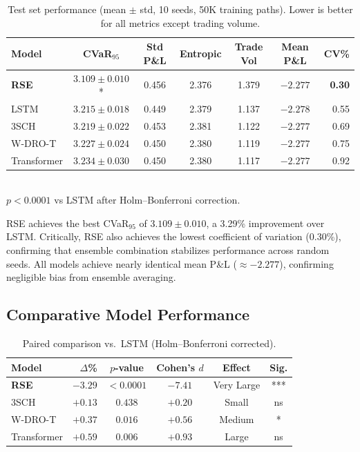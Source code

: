 \begin{table}[H]
\centering\small
\caption{Test set performance (mean $\pm$ std, 10 seeds, 50K training paths). Lower is better for all metrics except trading volume.}
\label{tab:main_results}
\begin{tabular}{@{}lcccccr@{}}
\toprule
\textbf{Model} & \textbf{CVaR$_{95}$} & \textbf{Std P\&L} & \textbf{Entropic} & \textbf{Trade Vol} & \textbf{Mean P\&L} & \textbf{CV\%} \\\midrule
\textbf{RSE} & $\mathbf{3.109 \pm 0.010}$* & 0.456 & 2.376 & 1.379 & $-2.277$ & \textbf{0.30} \\
LSTM & $3.215 \pm 0.018$ & 0.449 & 2.379 & 1.137 & $-2.278$ & 0.55 \\
3SCH & $3.219 \pm 0.022$ & 0.453 & 2.381 & 1.122 & $-2.277$ & 0.69 \\
W-DRO-T & $3.227 \pm 0.024$ & 0.450 & 2.380 & 1.119 & $-2.277$ & 0.75 \\
Transformer & $3.234 \pm 0.030$ & 0.450 & 2.380 & 1.117 & $-2.277$ & 0.92 \\
\midrule

\end{tabular}
\\[3pt]{\footnotesize * $p < 0.0001$ vs LSTM after Holm--Bonferroni correction.}
\end{table}

RSE achieves the best CVaR$_{95}$ of $3.109 \pm 0.010$, a 3.29\% improvement over LSTM. Critically, RSE also achieves the lowest coefficient of variation (0.30\%), confirming that ensemble combination stabilizes performance across random seeds. All models achieve nearly identical mean P\&L ($\approx -2.277$), confirming negligible bias from ensemble averaging.

\subsection{Comparative Model Performance}

\begin{table}[H]
\centering\small
\caption{Paired comparison vs.\ LSTM (Holm--Bonferroni corrected).}
\label{tab:paired}
\begin{tabular}{@{}lrcccc@{}}
\toprule
\textbf{Model} & \textbf{$\Delta$\%} & \textbf{$p$-value} & \textbf{Cohen's $d$} & \textbf{Effect} & \textbf{Sig.} \\\midrule
\textbf{RSE} & $-3.29$ & $< 0.0001$ & $-7.41$ & Very Large & *** \\
3SCH & $+0.13$ & $0.438$ & $+0.20$ & Small & ns \\
W-DRO-T & $+0.37$ & $0.016$ & $+0.56$ & Medium & * \\
Transformer & $+0.59$ & $0.006$ & $+0.93$ & Large & ns \\
\bottomrule
\end{tabular}
\end{table}

